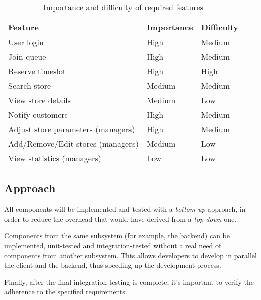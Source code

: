 \begin{table}[h]
    \centering
    \begin{tabular}[h]{|l|l|l|}
        \hline
        \textbf{Feature} & \textbf{Importance} & \textbf{Difficulty} \\\hline
        User login & High & Medium \\
        Join queue & High & Medium \\
        Reserve timeslot & High & High \\
        Search store & Medium & Medium \\
        View store details & Medium & Low \\
        Notify customers & High & Medium \\
        Adjust store parameters (managers) & High & Medium \\
        Add/Remove/Edit stores (managers) & Medium & Low \\
        View statistics (managers) & Low & Low \\
        \hline
    \end{tabular}
    \caption{Importance and difficulty of required features}
    \label{tab:features}
\end{table}

\subsection{Approach}

All components will be implemented and tested with a \emph{bottom-up} approach, in order to reduce the overhead that would have derived from a \emph{top-down} one.

Components from the same subsystem (for example, the backend) can be implemented, unit-tested and integration-tested without a real need of components from another subsystem. This allows developers to develop in parallel the client and the backend, thus speeding up the development process.

Finally, after the final integration testing is complete, it's important to verify the adherence to the specified requirements.



